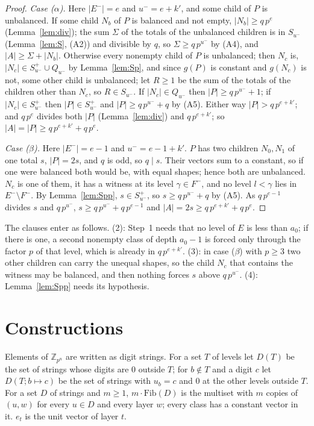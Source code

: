 \documentclass[11pt,a4paper]{amsart}
\theoremstyle{definition}
\theoremstyle{remark}
\newcommand{\Z}{\mathbb{Z}}
\newcommand{\Sp}{S^{+}}
\begin{document}
\begin{proof}
\emph{Case ($\alpha$).} Here $|E^-|=e$ and $u^-=e+k'$, and some child of $P$ is unbalanced. If some child
$N_b$ of $P$ is balanced and not empty, $|N_b|\ge q\,p^e$ (Lemma~\ref{lem:div}); the sum $\Sigma$ of the totals
of the unbalanced children is in $S_{u^-}$ (Lemma~\ref{lem:S}, (A2)) and divisible by $q$, so
$\Sigma\ge q\,p^{u^-}$ by (A4), and $|A|\ge\Sigma+|N_b|$. Otherwise every nonempty child of $P$ is unbalanced;
then $N_c$ is, $|N_c|\in\Sp_{u^-}\cup Q_{u^-}$ by Lemma~\ref{lem:Sp}, and since $g(P)$ is constant and
$g(N_c)$ is not, some other child is unbalanced; let $R\ge1$ be the sum of the totals of the children other
than $N_c$, so $R\in S_{u^-}$. If $|N_c|\in Q_{u^-}$ then $|P|\ge q\,p^{u^-}+1$; if $|N_c|\in\Sp_{u^-}$ then
$|P|\in\Sp_{u^-}$ and $|P|\ge q\,p^{u^-}+q$ by (A5). Either way $|P|>q\,p^{e+k'}$; and $q\,p^e$ divides both
$|P|$ (Lemma~\ref{lem:div}) and $q\,p^{e+k'}$; so $|A|=|P|\ge q\,p^{e+k'}+q\,p^e$.

\emph{Case ($\beta$).} Here $|E^-|=e-1$ and $u^-=e-1+k'$. $P$ has two children $N_0,N_1$ of one total $s$,
$|P|=2s$, and $q$ is odd, so $q\mid s$. Their vectors sum to a constant, so if one were balanced both would
be, with equal shapes; hence both are unbalanced. $N_c$ is one of them, it has a witness at its level
$\gamma\in F^-$, and no level $l<\gamma$ lies in $E^-\setminus F^-$. By Lemma~\ref{lem:Spp}, $s\in\Sp_{u^-}$, so
$s\ge q\,p^{u^-}+q$ by (A5). As $q\,p^{e-1}$ divides $s$ and $q\,p^{u^-}$,
$s\ge q\,p^{u^-}+q\,p^{e-1}$ and $|A|=2s\ge q\,p^{e+k'}+q\,p^e$.
\end{proof}

The clauses enter as follows. (2): Step~1 needs that no level of $E$ is less than $a_0$; if there is one, a second nonempty class of
depth $a_0-1$ is forced only through the factor $p$ of that level, which is already in $q\,p^{e+k'}$.
(3): in case ($\beta$) with $p\ge3$ two other children can carry the unequal shapes, so the child $N_c$
that contains the witness may be balanced, and then nothing forces $s$ above $q\,p^{u^-}$. (4):
Lemma~\ref{lem:Spp} needs its hypothesis.

\section{Constructions}\label{sec:constructions}

Elements of $\Z_{p^n}$ are written as digit strings. For a set $T$ of levels let $D(T)$ be the set of
strings whose digits are $0$ outside $T$; for $b\notin T$ and a digit $c$ let $D(T;b\mapsto c)$ be the set of
strings with $u_b=c$ and $0$ at the other levels outside $T$. For a set $D$ of strings and $m\ge1$,
$m\cdot\mathrm{Fib}(D)$ is the multiset with $m$ copies of $(u,w)$ for every $u\in D$ and every layer $w$;
every class has a constant vector in it. $e_t$ is the unit vector of layer $t$.
\end{document}
